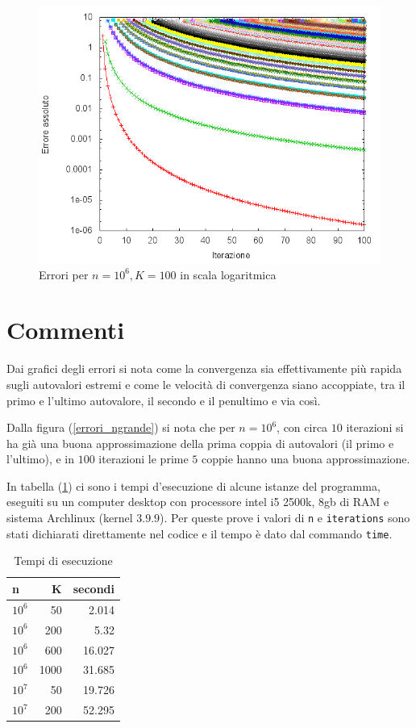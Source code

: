 \documentclass[11pt]{article}
\numberwithin{equation}{subsection}
\theoremstyle{connome}
\theoremstyle{connomesenzanumero}
\theoremstyle{connome+}
\theoremstyle{connomesenzanumero+}
\begin{document}
\begin{figure}[htb]
\centering
\includegraphics[width=.9\linewidth]{./img/errors_n10^6K100_log.png}
\caption{Errori per $n=10^6, K=100$ in scala logaritmica}
\end{figure}


\section{Commenti}
\label{sec-4}
Dai grafici degli errori si nota come la convergenza sia effettivamente più rapida sugli autovalori estremi e come le velocità di convergenza siano accoppiate, tra il primo e l'ultimo autovalore, il secondo e il penultimo e via così.

Dalla figura (\ref{errori_ngrande}) si nota che per $n=10^6$, con circa $10$ iterazioni si ha già una buona approssimazione della prima coppia di autovalori (il primo e l'ultimo), e in $100$ iterazioni le prime $5$ coppie hanno una buona approssimazione.

In tabella (\ref{tempi}) ci sono i tempi d'esecuzione di alcune istanze del programma, eseguiti su un computer desktop con processore intel i5 2500k, 8gb di RAM e sistema Archlinux (kernel $3.9.9$). Per queste prove i valori di \verb~n~ e \verb~iterations~ sono stati dichiarati direttamente nel codice e il tempo è dato dal commando \verb~time~.

\begin{table}[htb]
\caption{\label{tempi}Tempi di esecuzione}
\centering
\begin{tabular}{lrr}
n & K & secondi\\
\hline
$10^{6}$ & 50 & 2.014\\
$10^{6}$ & 200 & 5.32\\
$10^{6}$ & 600 & 16.027\\
$10^{6}$ & 1000 & 31.685\\
$10^{7}$ & 50 & 19.726\\
$10^{7}$ & 200 & 52.295\\
\end{tabular}
\end{table}
\end{document}
